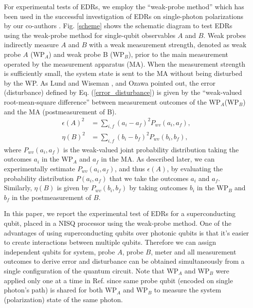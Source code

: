 \documentclass[%
reprint,
superscriptaddress,
 amsmath,amssymb,
 aps,
pra,
]{revtex4-2}
\begin{document}
For experimental tests of EDRs, we employ the ``weak-probe method''\cite{Lund_2010, OZAWA200511} which has been used in the successful investigation of EDRs on single-photon polarizations by our co-authors \cite{PhysRevLett.112.020402}. 
Fig. \ref{scheme} shows the schematic diagram to test EDRs using the weak-probe method for single-qubit observables $A$ and $B$.
Weak probes indirectly measure $A$ and $B$ with a weak measurement strength, denoted as weak probe $A$ (WP$_A$) and  weak probe B (WP$_B$), prior to the main measurement operated by the measurement apparatus (MA).
When the measurement strength is sufficiently small, the system state is sent to the MA without being disturbed by the WP. 
As Lund and Wiseman \cite{Lund_2010}, and Ozawa \cite{OZAWA200511} pointed out, the error (disturbance) defined by Eq. (\ref{error_disturbance}) is given by the ``weak-valued root-mean-square difference'' between measurement outcomes of the WP$_A$(WP$_B$) and the MA (postmeasurement of B).
\begin{equation}
    \label{weak_value}
    \begin{aligned}
       \epsilon(A)^2 &= \sum_{i,f}(a_i-a_f)^2P_{wv}(a_i,a_f), \\
        \eta(B)^2 &= \sum_{i,f}(b_i-b_f)^2P_{wv}(b_i,b_f),
    \end{aligned}
\end{equation}
where $P_{wv}(a_i,a_f)$ is the weak-valued joint probability distribution taking the outcomes $a_i$ in the WP$_A$ and $a_f$ in the MA. As described later, we can experimentally estimate $P_{wv}(a_i,a_f)$, and thus $ \epsilon(A)$, by evaluating the probability distribution $P(a_i, a_f)$ that we take the outcomes $a_i$ and $a_f$. Similarly, $\eta(B)$ is given by $P_{wv}(b_i,b_f)$ by taking outcomes $b_i$ in the WP$_B$ and $b_f$ in the postmeasurement of $B$.

In this paper, we report the experimental test of EDRs for a superconducting qubit, placed in a NISQ processor using the weak-probe method. 
One of the advantages of using superconducting qubits over photonic qubits \cite{PhysRevLett.112.020402} is that it's easier to create interactions between multiple qubits. 
Therefore we can assign independent qubits for system, probe $A$, probe $B$, meter and all measurement outcomes to derive error and disturbance can be obtained simultaneously from a single configuration of the quantum circuit. 
Note that WP$_A$ and WP$_B$ were applied only one at a time in Ref. \cite{PhysRevLett.112.020402} since same probe qubit (encoded on single photon's path) is shared for both WP$_A$ and WP$_B$ to measure the system (polarization) state of the same photon. 
\end{document}

